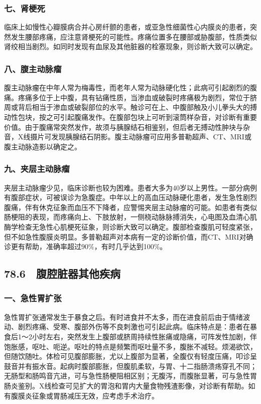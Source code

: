 \subsubsection{七、肾梗死}

临床上如慢性心瓣膜病合并心房纤颤的患者，或亚急性细菌性心内膜炎的患者，突然发生腰部疼痛，应注意肾梗死的可能性。疼痛位置多在腰部或胁腹部，性质类似肾绞相当剧烈。如同时发现有血尿及其他脏器的栓塞现象，则诊断大致可以确定。

\subsubsection{八、腹主动脉瘤}

腹主动脉瘤在中年人常为梅毒性，而老年人常为动脉硬化性；此病可引起剧烈的腹痛。疼痛多位于上中腹，具有钻痛性质，当渗血或破裂时疼痛极为剧烈，常位于脐周或背后相当于渗血或破裂部位的水平。触诊可在上、中腹部触及小儿拳头大的搏动性包块，按之可引起腹痛发作。在腹部包块上可听到滚筒样杂音，对诊断有重要价值。由于腹痛常突然发作，故须与胰腺结石相鉴别，但后者无搏动性肿块与杂音，X线摄片可发现胰腺结石阴影。腹主动脉瘤可应用多普勒超声、CT、MRI或腹主动脉造影以确定之。

\subsubsection{九、夹层主动脉瘤}

夹层主动脉瘤少见，临床诊断也较为困难。患者大多为40岁以上男性。一部分病例有腹部症状，可被误诊为急腹症。中年以上的高血压动脉硬化患者，发生急性剧烈腹痛，伴有休克征象而血压不下降者，应警惕夹层主动脉瘤的可能。如患者有类似肠梗阻的表现，而疼痛向上、下肢放射，一侧桡动脉脉搏消失，心电图及血清心肌酶学检查无急性心肌梗死征象，则诊断大致可以确定。腹部检查腹肌可轻度紧张，但不如急性腹膜炎明显。多普勒超声对本病有一定的诊断价值，而CT、MRI对确诊更有帮助，准确率超过90\%，有时几乎达到100\%。

\protect\hypertarget{text00199.html}{}{}

\subsection{78.6　腹腔脏器其他疾病}

\subsubsection{一、急性胃扩张}

急性胃扩张通常发生于暴食之后。有时进食并不太多，而在进食前后由于情绪波动、剧烈疼痛、受寒、腹部外伤等不良刺激也可引起此病。临床特点是：患者在暴食后1～2小时左右，突然发生上腹部或脐周持续性胀痛或隐痛，可阵发性加剧，伴饱胀感，呕吐、呃逆。呕吐的特点是频繁而呕吐量不多，腹胀不减轻。烦渴欲饮，但随饮随吐。体检可见腹部膨胀，尤以上腹部为显著，全腹仅有轻度压痛，叩诊呈鼓音并有振水音。起病时腹部膨胀，但腹肌柔软，与胃、十二指肠溃疡穿孔不同；无肠型和肠鸣音亢进，可与急性肠梗阻相区别；无腹泻，而腹胀显著，可与急性胃肠炎鉴别。X线检查可见扩大的胃泡和胃内大量食物残渣影像，对诊断有帮助。如有腹膜炎征象或胃肠减压无效，应考虑手术治疗。

